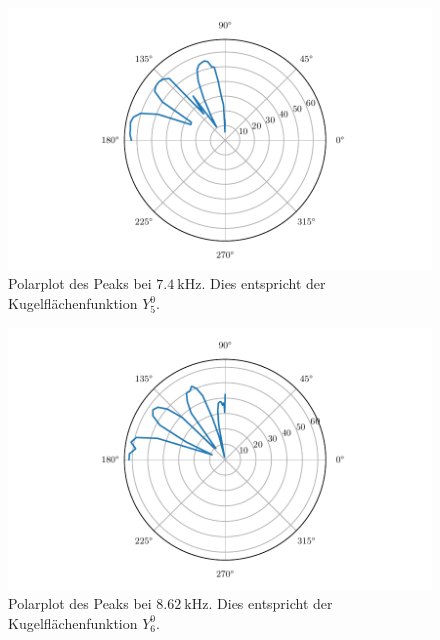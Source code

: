 \begin{figure}
    \centering
    \includegraphics{build/hvarangle74.pdf}
    \caption{Polarplot des Peaks bei $\qty{7.4}{\kilo\hertz}$. Dies entspricht der Kugelflächenfunktion $Y_5^0$.}
    \label{fig:hvarangle74}
\end{figure}
\begin{figure}
    \centering
    \includegraphics{build/hvarangle86.pdf}
    \caption{Polarplot des Peaks bei $\qty{8.62}{\kilo\hertz}$. Dies entspricht der Kugelflächenfunktion $Y_6^0$.}
    \label{fig:hvarangle86}
\end{figure}
\FloatBarrier

